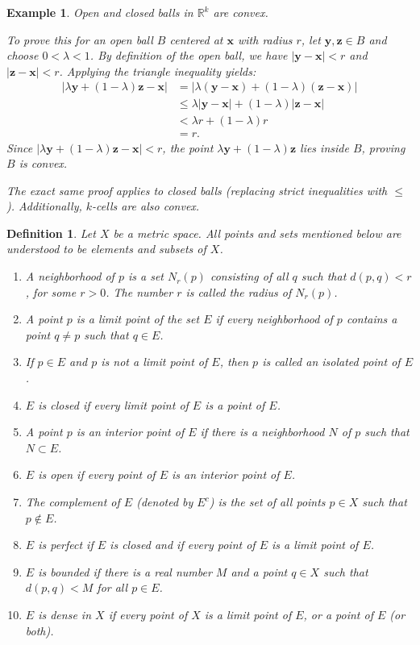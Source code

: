 \documentclass{article}
\theoremstyle{mythm}
\newtheorem{definition}[theorem]{Definition}
\newtheorem{example}[theorem]{Example}
\begin{document}
\begin{example}
Open and closed balls in $\mathbb{R}^k$ are convex. 

To prove this for an open ball $B$ centered at $\mathbf{x}$ with radius $r$, let $\mathbf{y}, \mathbf{z} \in B$ and choose $0 < \lambda < 1$. By definition of the open ball, we have $|\mathbf{y} - \mathbf{x}| < r$ and $|\mathbf{z} - \mathbf{x}| < r$. Applying the triangle inequality yields:
\begin{align*}
|\lambda \mathbf{y} + (1 - \lambda)\mathbf{z} - \mathbf{x}| &= |\lambda(\mathbf{y} - \mathbf{x}) + (1 - \lambda)(\mathbf{z} - \mathbf{x})| \\
&\le \lambda |\mathbf{y} - \mathbf{x}| + (1 - \lambda)|\mathbf{z} - \mathbf{x}| \\
&< \lambda r + (1 - \lambda)r \\
&= r.
\end{align*}
Since $|\lambda \mathbf{y} + (1 - \lambda)\mathbf{z} - \mathbf{x}| < r$, the point $\lambda \mathbf{y} + (1 - \lambda)\mathbf{z}$ lies inside $B$, proving $B$ is convex.

The exact same proof applies to closed balls (replacing strict inequalities with $\le$). Additionally, $k$-cells are also convex.
\end{example}
\begin{definition}
Let $X$ be a metric space. All points and sets mentioned below are understood to be elements and subsets of $X$.
\begin{enumerate}[label=(\alph*)]
    \item A \textit{neighborhood} of $p$ is a set $N_r(p)$ consisting of all $q$ such that $d(p, q) < r$, for some $r > 0$. The number $r$ is called the \textit{radius} of $N_r(p)$.
    \item A point $p$ is a \textit{limit point} of the set $E$ if every neighborhood of $p$ contains a point $q \neq p$ such that $q \in E$.
    \item If $p \in E$ and $p$ is not a limit point of $E$, then $p$ is called an \textit{isolated point} of $E$.
    \item $E$ is \textit{closed} if every limit point of $E$ is a point of $E$.
    \item A point $p$ is an \textit{interior point} of $E$ if there is a neighborhood $N$ of $p$ such that $N \subset E$.
    \item $E$ is \textit{open} if every point of $E$ is an interior point of $E$.
    \item The \textit{complement} of $E$ (denoted by $E^c$) is the set of all points $p \in X$ such that $p \notin E$.
    \item $E$ is \textit{perfect} if $E$ is closed and if every point of $E$ is a limit point of $E$.
    \item $E$ is \textit{bounded} if there is a real number $M$ and a point $q \in X$ such that $d(p, q) < M$ for all $p \in E$.
    \item $E$ is \textit{dense} in $X$ if every point of $X$ is a limit point of $E$, or a point of $E$ (or both).
\end{enumerate}
\end{definition}
\end{document}
